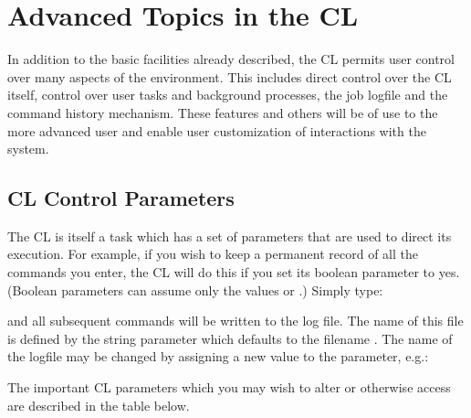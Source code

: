\newpage
\section{Advanced Topics in the CL}

\ppind
In addition to the basic facilities already described,
the CL permits user control over many aspects of the environment.
This includes direct control over the CL itself, control over user tasks
and background processes, the job logfile and the command history mechanism.
These features and others will be of use to the more advanced user
and enable user customization of interactions with the system.

\subsection{CL Control Parameters}

\ppind
The CL is itself a task which has a set of parameters that
are used to direct its execution. For example, if you wish to keep
a permanent record of all the commands you enter, the CL will do this
if you set its boolean parameter  to yes. (Boolean
parameters can assume only the values  or .)
Simply type:

\begin{quotation}\noindent
{} 
\end{quotation}

\noindent
and all subsequent commands will be written to the log file.
The name of this file is defined by the
string parameter  which defaults to the filename
.  The name of the logfile may be changed
by assigning a new value to the parameter, e.g.:

\begin{quotation}\noindent
{} 
\end{quotation}

The important CL parameters which you may wish to alter or otherwise
access are described in the table below.

